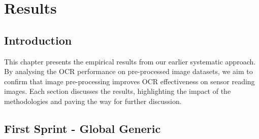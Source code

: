 \chapter{Results}
\label{chap:results}

\section{Introduction}


This chapter presents the empirical results from our earlier systematic approach. By analysing the OCR performance on pre-processed image datasets, we aim to confirm that image pre-processing improves OCR effectiveness on sensor reading images. Each section discusses the results, highlighting the impact of the methodologies and paving the way for further discussion.

\section{First Sprint - Global Generic}


